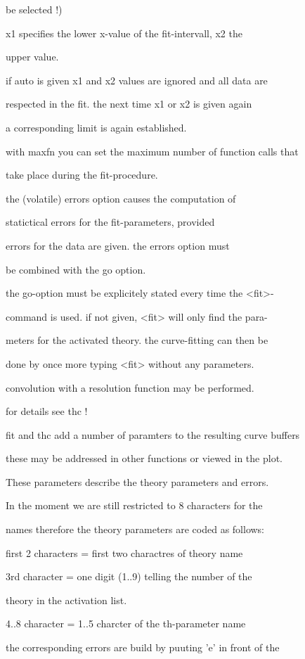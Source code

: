 \documentclass[]{article}
\begin{document}
be selected !)

x1 specifies the lower x-value of the fit-intervall, x2 the

upper value.

if auto is given x1 and x2 values are ignored and all data are

respected in the fit. the next time x1 or x2 is given again

a corresponding limit is again established.

with maxfn you can set the maximum number of function calls that

take place during the fit-procedure.

the (volatile) errors option causes the computation of

statictical errors for the fit-parameters, provided

errors for the data are given. the errors option must

be combined with the go option.

the go-option must be explicitely stated every time the
\textless{}fit\textgreater{}-

command is used. if not given, \textless{}fit\textgreater{} will only
find the para-

meters for the activated theory. the curve-fitting can then be

done by once more typing \textless{}fit\textgreater{} without any
parameters.

convolution with a resolution function may be performed.

for details see thc !

fit and thc add a number of paramters to the resulting curve buffers

these may be addressed in other functions or viewed in the plot.

These parameters describe the theory parameters and errors.

In the moment we are still restricted to 8 characters for the

names therefore the theory parameters are coded as follows:

first 2 characters = first two charactres of theory name

3rd character = one digit (1..9) telling the number of the

theory in the activation list.

4..8 character = 1..5 charcter of the th-parameter name

the corresponding errors are build by puuting 'e' in front of the
\end{document}
